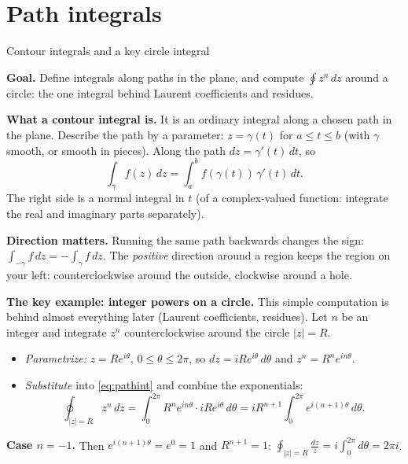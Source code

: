 \documentclass[11pt]{beamer}
\begin{document}
\section{Path integrals}

\begin{frame}[allowframebreaks=1.00]{Contour integrals and a key circle integral}
\footnotesize

\textbf{Goal.} Define integrals along paths in the plane, and compute \(\oint z^n\,dz\) around a circle:
the one integral behind Laurent coefficients and residues.

\textbf{What a contour integral is.} It is an ordinary integral along a chosen path in the
plane. Describe the path by a parameter: \(z=\gamma(t)\) for \(a\le t\le b\) (with \(\gamma\) smooth, or
smooth in pieces). Along the path \(dz=\gamma'(t)\,dt\), so
\begin{equation}
 \int_\gamma f(z)\,dz=\int_a^b f(\gamma(t))\,\gamma'(t)\,dt.
 \label{eq:pathint}
\end{equation}
The right side is a normal integral in \(t\) (of a complex-valued function: integrate the real and
imaginary parts separately).

\textbf{Direction matters.} Running the same path backwards changes the sign:
\(\int_{-\gamma}f\,dz=-\int_\gamma f\,dz\). The \emph{positive} direction around a region keeps the
region on your left: counterclockwise around the outside, clockwise around a hole.
\par\framebreak\par
\textbf{The key example: integer powers on a circle.} This simple computation is behind almost
everything later (Laurent coefficients, residues). Let \(n\) be an integer and integrate \(z^n\)
counterclockwise around the circle \(|z|=R\).
\begin{itemize}
  \item \emph{Parametrize:} \(z=Re^{i\theta}\), \(0\le\theta\le2\pi\), so \(dz=iRe^{i\theta}\,d\theta\) and
        \(z^n=R^ne^{in\theta}\).
  \item \emph{Substitute} into \eqref{eq:pathint} and combine the exponentials:
        \[
         \oint_{|z|=R}z^n\,dz
         =\int_0^{2\pi}R^ne^{in\theta}\cdot iRe^{i\theta}\,d\theta
         =iR^{n+1}\int_0^{2\pi}e^{i(n+1)\theta}\,d\theta.
        \]
\end{itemize}
\textbf{Case \(n=-1\).} Then \(e^{i(n+1)\theta}=e^0=1\) and \(R^{n+1}=1\):
\(\displaystyle\oint_{|z|=R}\frac{dz}{z}=i\int_0^{2\pi}d\theta=2\pi i\).


\end{frame}
\end{document}

